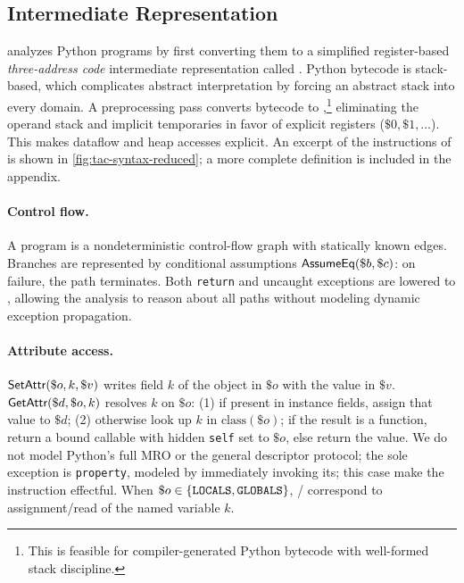 \subsection{Intermediate Representation}
\spyte analyzes Python programs by first converting them to a simplified
register-based \emph{three-address code} intermediate representation called \spytecode. 
Python bytecode is stack-based, which complicates
abstract interpretation by forcing an abstract stack into every domain. A preprocessing
pass converts bytecode to \spytecode,\footnote{This is feasible for compiler-generated Python bytecode with well-formed stack discipline.}
eliminating the operand stack and implicit temporaries in favor of explicit registers
($\$0, \$1, \ldots$). This makes dataflow and heap accesses explicit.
An excerpt of the instructions of \spytecode is shown in \cref{fig:tac-syntax-reduced}; a more complete
definition is included in the appendix.

\paragraph{Control flow.}
A \spytecode program is a nondeterministic control-flow graph with statically known edges.
Branches are represented by conditional assumptions $\textsf{AssumeEq}(\$b, \$c)$:
on failure, the path terminates. Both \texttt{return} and uncaught exceptions
are lowered to \tExit, allowing the analysis to reason about all paths
without modeling dynamic exception propagation.

\paragraph{Attribute access.}
$\textsf{SetAttr}(\$o, k, \$v)$ writes field $k$ of the object in $\$o$ with the value in $\$v$.
$\textsf{GetAttr}(\$d, \$o, k)$ resolves $k$ on $\$o$:
(1) if present in instance fields, assign that value to $\$d$;
(2) otherwise look up $k$ in $\mathrm{class}(\$o)$; if the result is a function, return
a bound callable with hidden \texttt{self} set to $\$o$, else return the value.
We do not model Python's full MRO or the general descriptor protocol; the sole
exception is \texttt{property}, modeled by immediately invoking its; this case make the instruction effectful.
When $\$o \in \{\texttt{LOCALS}, \texttt{GLOBALS}\}$, \tSetAttr/\tGetAttr
correspond to assignment/read of the named variable $k$.

